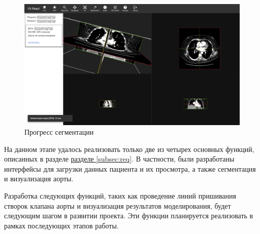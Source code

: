 \begin{figure}[h!]
    \centering
    \includegraphics[]{images/chap3/progress.png}
    \caption{Прогресс сегментации}
    \label{fig:progress}
\end{figure}

На данном этапе удалось реализовать только две из четырех основных функций, описанных в разделе \hyperref[subsec:req]{разделе \ref{subsec:req}}. В частности, были разработаны интерфейсы для загрузки данных пациента и их просмотра, а также сегментация и визуализация аорты.

Разработка следующих функций, таких как проведение линий пришивания створок клапана аорты и визуализация результатов моделирования, будет следующим шагом в развитии проекта. Эти функции планируется реализовать в рамках последующих этапов работы.

\endinput